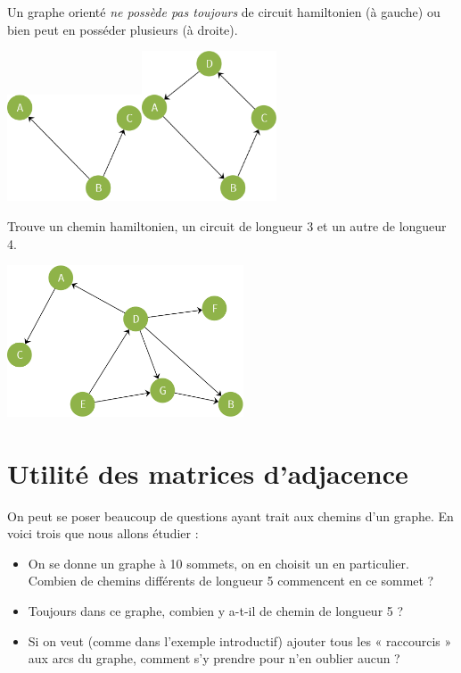 \begin{remarque}[]
    Un graphe orienté \textit{ne possède pas toujours} de circuit hamiltonien (à gauche) ou bien peut en posséder plusieurs (à droite).
    \begin{center}
        \includegraphics[width=4cm]{graphes/img/pas_de_ch.png}\hspace{2em}\includegraphics[width=4cm]{graphes/img/plusieurs_ch.png}
    \end{center}
\end{remarque}

\begin{exercice}[]
    Trouve un chemin hamiltonien, un circuit de longueur 3 et un autre de longueur 4.
    \begin{center}
        \includegraphics[width=7cm]{graphes/img/ex_circuit_ch.png}
    \end{center}
\end{exercice}

\section{Utilité des matrices d'adjacence}
On peut se poser beaucoup de questions ayant trait aux chemins d'un graphe. En voici trois que nous allons étudier :
\begin{itemize}
    \item 	On se donne un graphe à 10 sommets, on en choisit un en particulier. Combien de chemins différents de longueur 5 commencent en ce sommet ?
    \item 	Toujours dans ce graphe, combien y a-t-il de chemin de longueur 5 ?
    \item 	Si on veut (comme dans l'exemple introductif) ajouter tous les  «  raccourcis »  aux arcs du graphe, comment s'y prendre pour n'en oublier aucun ?
\end{itemize}



